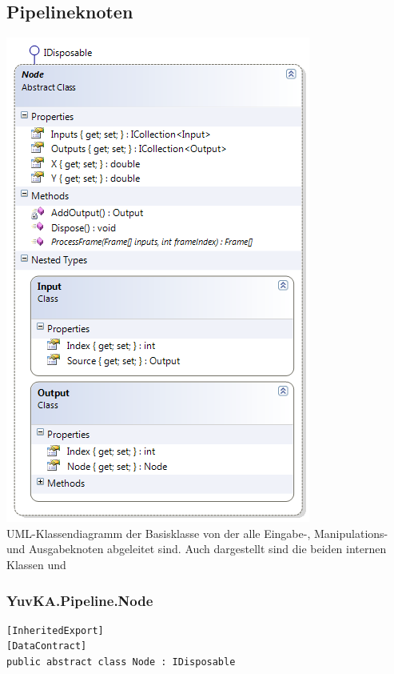 \subsection{Pipelineknoten}
\begin{center}\includegraphics[scale=0.7]{YuvKA.Pipeline/node.png} \\
UML-Klassendiagramm der Basisklasse  von der alle Eingabe-, Manipulations- und Ausgabeknoten abgeleitet sind. Auch dargestellt sind die beiden internen Klassen  und 
\end{center}

\subsubsection{YuvKA.Pipeline.Node}

\begin{verbatim}
[InheritedExport]
[DataContract]
public abstract class Node : IDisposable
\end{verbatim}


